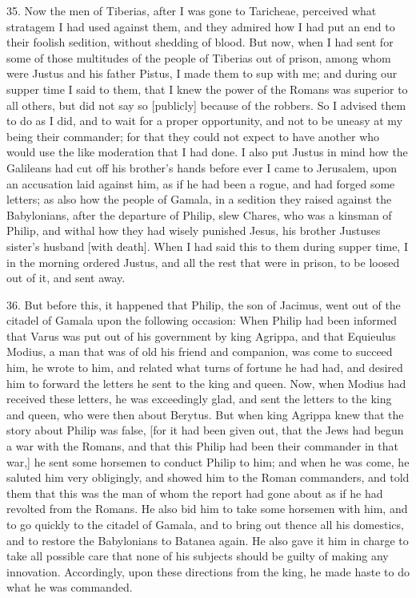 35. Now the men of Tiberias, after I was gone to Taricheae, perceived what
stratagem I had used against them, and they admired how I had put an end
to their foolish sedition, without shedding of blood. But now, when I had
sent for some of those multitudes of the people of Tiberias out of prison,
among whom were Justus and his father Pistus, I made them to sup with me;
and during our supper time I said to them, that I knew the power of the
Romans was superior to all others, but did not say so [publicly] because
of the robbers. So I advised them to do as I did, and to wait for a proper
opportunity, and not to be uneasy at my being their commander; for that
they could not expect to have another who would use the like moderation
that I had done. I also put Justus in mind how the Galileans had cut off
his brother's hands before ever I came to Jerusalem, upon an accusation
laid against him, as if he had been a rogue, and had forged some letters;
as also how the people of Gamala, in a sedition they raised against the
Babylonians, after the departure of Philip, slew Chares, who was a kinsman
of Philip, and withal how they had wisely punished Jesus, his brother
Justuses sister's husband [with death]. When I had said this to them
during supper time, I in the morning ordered Justus, and all the rest that
were in prison, to be loosed out of it, and sent away.

36. But before this, it happened that Philip, the son of Jacimus, went out
of the citadel of Gamala upon the following occasion: When Philip had been
informed that Varus was put out of his government by king Agrippa, and
that Equieulus Modius, a man that was of old his friend and companion, was
come to succeed him, he wrote to him, and related what turns of fortune he
had had, and desired him to forward the letters he sent to the king and
queen. Now, when Modius had received these letters, he was exceedingly
glad, and sent the letters to the king and queen, who were then about
Berytus. But when king Agrippa knew that the story about Philip was false,
[for it had been given out, that the Jews had begun a war with the Romans,
and that this Philip had been their commander in that war,] he sent some
horsemen to conduct Philip to him; and when he was come, he saluted him
very obligingly, and showed him to the Roman commanders, and told them
that this was the man of whom the report had gone about as if he had
revolted from the Romans. He also bid him to take some horsemen with him,
and to go quickly to the citadel of Gamala, and to bring out thence all
his domestics, and to restore the Babylonians to Batanea again. He also
gave it him in charge to take all possible care that none of his subjects
should be guilty of making any innovation. Accordingly, upon these
directions from the king, he made haste to do what he was commanded.

